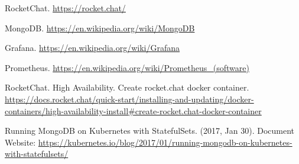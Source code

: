 \documentclass[12pt,a4paper,oneside]{report}
\begin{document}
%
\cleardoublepage
%
\begin{thebibliography}{9}

RocketChat. \url{https://rocket.chat/}

MongoDB. \url{https://en.wikipedia.org/wiki/MongoDB}

Grafana. \url{https://en.wikipedia.org/wiki/Grafana}

Prometheus. \url{https://en.wikipedia.org/wiki/Prometheus_(software)}

RocketChat. High Availability. Create rocket.chat docker container. \url{https://docs.rocket.chat/quick-start/installing-and-updating/docker-containers/high-availability-install#create-rocket.chat-docker-container}

Running MongoDB on Kubernetes with StatefulSets. (2017, Jan 30). Document Website: \url{https://kubernetes.io/blog/2017/01/running-mongodb-on-kubernetes-with-statefulsets/}

\end{thebibliography}
\end{document}
